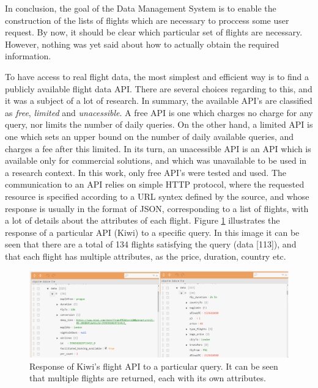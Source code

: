 In conclusion, the goal of the Data Management System is to enable the construction 
of the lists of flights which are necessary to proccess some user request.
By now, it should be clear which particular set of flights are necessary.
However, nothing was yet said about how to actually obtain the required information.

To have access to real flight data, the most simplest and efficient way is to 
find a publicly available flight data API. There are several choices regarding to this,
and it was a subject of a lot of research.
In summary, the available API's are classified as \textit{free}, \textit{limited} and \textit{unacessible}.
A free API is one which charges no charge for any query, nor limits the number of daily queries.
On the other hand, a limited API is one which sets an upper bound on the number of daily available queries,
and charges a fee after this limited. In its turn, an unacessible API is an API which is available 
only for commercial solutions, and which was unavailable to be used in a research context.
In this work, only free API's were tested and used.
The communication to an API relies on simple HTTP protocol, where the requested resource 
is specified according to a URL syntex defined by the source,
and whose response is usually in the format of JSON, corresponding to a list of flights,
with a lot of details about the attributes of each flight.
Figure \ref{fig:kiwi_response} illustrates the response of a particular API (Kiwi) to a specific query.
In this image it can be seen that there are a total of 134 flights satisfying the query (data [113]),
and that each flight has multiple attributes, as the price, duration, country etc.

\begin{figure}[htpb]
  \centering
  \includegraphics[width=\textwidth]{./Figures/system_design/kiwi_response.png}
  \caption{Response of Kiwi's flight API to a particular query. It can be seen 
  that multiple flights are returned, each with its own attributes.}
  \label{fig:kiwi_response}  
\end{figure}

